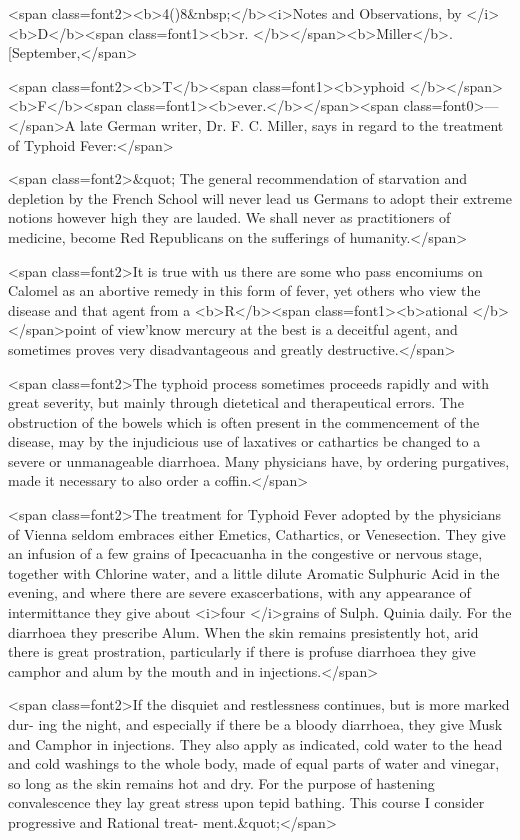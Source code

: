 <span class=font2><b>4()8&nbsp;</b><i>Notes and Observations, by </i><b>D</b><span class=font1><b>r. </b></span><b>Miller</b>. [September,</span>

<span class=font2><b>T</b><span class=font1><b>yphoid </b></span><b>F</b><span class=font1><b>ever.</b></span><span class=font0>---</span>A late German writer, Dr. F. C. Miller, says in
regard to the treatment of Typhoid Fever:</span>

<span class=font2>&quot; The general recommendation of starvation and depletion by the
French School will never lead us Germans to adopt their extreme notions
however high they are lauded. We shall never as practitioners of
medicine, become Red Republicans on the sufferings of humanity.</span>

<span class=font2>It is true with us there are some who pass encomiums on Calomel as an
abortive remedy in this form of fever, yet others who view the disease
and that agent from a <b>R</b><span class=font1><b>ational </b></span>point of view'know mercury at the
best is a deceitful agent, and sometimes proves very disadvantageous
and greatly destructive.</span>

<span class=font2>The typhoid process sometimes proceeds rapidly and with great
severity, but mainly through dietetical and therapeutical errors. The
obstruction of the bowels which is often present in the commencement
of the disease, may by the injudicious use of laxatives or cathartics
be changed to a severe or unmanageable diarrhoea. Many physicians
have, by ordering purgatives, made it necessary to also order a coffin.</span>

<span class=font2>The treatment for Typhoid Fever adopted by the physicians of
Vienna seldom embraces either Emetics, Cathartics, or Venesection.
They give an infusion of a few grains of Ipecacuanha in the congestive
or nervous stage, together with Chlorine water, and a little dilute
Aromatic Sulphuric Acid in the evening, and where there are severe
exascerbations, with any appearance of intermittance they give about
<i>four </i>grains of Sulph. Quinia daily. For the diarrhoea they prescribe
Alum. When the skin remains presistently hot, arid there is great
prostration, particularly if there is profuse diarrhoea they give camphor
and alum by the mouth and in injections.</span>

<span class=font2>If the disquiet and restlessness continues, but is more marked dur-
ing the night, and especially if there be a bloody diarrhoea, they give
Musk and Camphor in injections. They also apply as indicated, cold
water to the head and cold washings to the whole body, made of equal
parts of water and vinegar, so long as the skin remains hot and dry.
For the purpose of hastening convalescence they lay great stress upon
tepid bathing. This course I consider progressive and Rational treat-
ment.&quot;</span>

